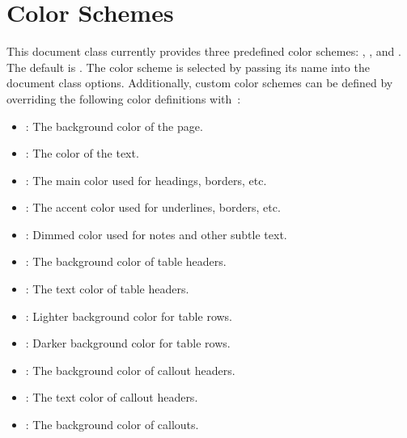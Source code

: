 \documentclass[article,ariandor]{plotweaver}
\begin{document}
\section{Color Schemes}
This document class currently provides three predefined color schemes: , , and . The default is . The color scheme is selected by passing its name into the document class options. Additionally, custom color schemes can be defined by overriding the following color definitions with~:
\begin{itemize}
    \item {}: The background color of the page.
    \item {}: The color of the text.
    \item {}: The main color used for headings, borders, etc.
    \item {}: The accent color used for underlines, borders, etc.
    \item {}: Dimmed color used for notes and other subtle text.
    \item {}: The background color of table headers.
    \item {}: The text color of table headers.
    \item {}: Lighter background color for table rows.
    \item {}: Darker background color for table rows.
    \item {}: The background color of callout headers.
    \item {}: The text color of callout headers.
    \item {}: The background color of callouts.
\end{itemize}
\end{document}
